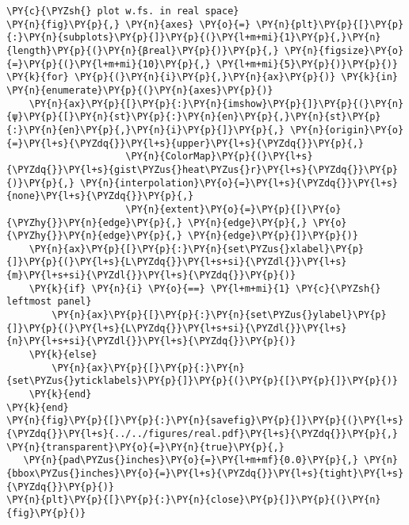 \begin{Verbatim}[commandchars=\\\{\}]
\PY{c}{\PYZsh{} plot w.fs. in real space}
\PY{n}{fig}\PY{p}{,} \PY{n}{axes} \PY{o}{=} \PY{n}{plt}\PY{p}{[}\PY{p}{:}\PY{n}{subplots}\PY{p}{]}\PY{p}{(}\PY{l+m+mi}{1}\PY{p}{,}\PY{n}{length}\PY{p}{(}\PY{n}{βreal}\PY{p}{)}\PY{p}{,} \PY{n}{figsize}\PY{o}{=}\PY{p}{(}\PY{l+m+mi}{10}\PY{p}{,} \PY{l+m+mi}{5}\PY{p}{)}\PY{p}{)}
\PY{k}{for} \PY{p}{(}\PY{n}{i}\PY{p}{,}\PY{n}{ax}\PY{p}{)} \PY{k}{in} \PY{n}{enumerate}\PY{p}{(}\PY{n}{axes}\PY{p}{)}
    \PY{n}{ax}\PY{p}{[}\PY{p}{:}\PY{n}{imshow}\PY{p}{]}\PY{p}{(}\PY{n}{ψ}\PY{p}{[}\PY{n}{st}\PY{p}{:}\PY{n}{en}\PY{p}{,}\PY{n}{st}\PY{p}{:}\PY{n}{en}\PY{p}{,}\PY{n}{i}\PY{p}{]}\PY{p}{,} \PY{n}{origin}\PY{o}{=}\PY{l+s}{\PYZdq{}}\PY{l+s}{upper}\PY{l+s}{\PYZdq{}}\PY{p}{,}
                     \PY{n}{ColorMap}\PY{p}{(}\PY{l+s}{\PYZdq{}}\PY{l+s}{gist\PYZus{}heat\PYZus{}r}\PY{l+s}{\PYZdq{}}\PY{p}{)}\PY{p}{,} \PY{n}{interpolation}\PY{o}{=}\PY{l+s}{\PYZdq{}}\PY{l+s}{none}\PY{l+s}{\PYZdq{}}\PY{p}{,}
                     \PY{n}{extent}\PY{o}{=}\PY{p}{[}\PY{o}{\PYZhy{}}\PY{n}{edge}\PY{p}{,} \PY{n}{edge}\PY{p}{,} \PY{o}{\PYZhy{}}\PY{n}{edge}\PY{p}{,} \PY{n}{edge}\PY{p}{]}\PY{p}{)}
    \PY{n}{ax}\PY{p}{[}\PY{p}{:}\PY{n}{set\PYZus{}xlabel}\PY{p}{]}\PY{p}{(}\PY{l+s}{L\PYZdq{}}\PY{l+s+si}{\PYZdl{}}\PY{l+s}{m}\PY{l+s+si}{\PYZdl{}}\PY{l+s}{\PYZdq{}}\PY{p}{)}
    \PY{k}{if} \PY{n}{i} \PY{o}{==} \PY{l+m+mi}{1} \PY{c}{\PYZsh{} leftmost panel}
        \PY{n}{ax}\PY{p}{[}\PY{p}{:}\PY{n}{set\PYZus{}ylabel}\PY{p}{]}\PY{p}{(}\PY{l+s}{L\PYZdq{}}\PY{l+s+si}{\PYZdl{}}\PY{l+s}{n}\PY{l+s+si}{\PYZdl{}}\PY{l+s}{\PYZdq{}}\PY{p}{)}
    \PY{k}{else}
        \PY{n}{ax}\PY{p}{[}\PY{p}{:}\PY{n}{set\PYZus{}yticklabels}\PY{p}{]}\PY{p}{(}\PY{p}{[}\PY{p}{]}\PY{p}{)}
    \PY{k}{end}
\PY{k}{end}
\PY{n}{fig}\PY{p}{[}\PY{p}{:}\PY{n}{savefig}\PY{p}{]}\PY{p}{(}\PY{l+s}{\PYZdq{}}\PY{l+s}{../../figures/real.pdf}\PY{l+s}{\PYZdq{}}\PY{p}{,} \PY{n}{transparent}\PY{o}{=}\PY{n}{true}\PY{p}{,}
   \PY{n}{pad\PYZus{}inches}\PY{o}{=}\PY{l+m+mf}{0.0}\PY{p}{,} \PY{n}{bbox\PYZus{}inches}\PY{o}{=}\PY{l+s}{\PYZdq{}}\PY{l+s}{tight}\PY{l+s}{\PYZdq{}}\PY{p}{)}
\PY{n}{plt}\PY{p}{[}\PY{p}{:}\PY{n}{close}\PY{p}{]}\PY{p}{(}\PY{n}{fig}\PY{p}{)}


\end{Verbatim}
